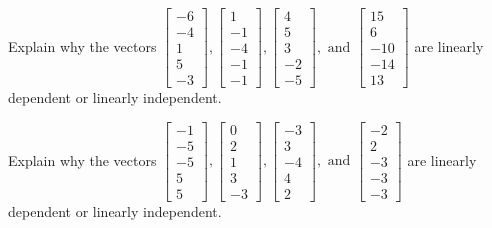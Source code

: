 \documentclass{article}
\begin{document}
\begin{exerciseStatement}
    Explain why the vectors \(\left[\begin{array}{r}
-6 \\
-4 \\
1 \\
5 \\
-3
\end{array}\right] , \left[\begin{array}{r}
1 \\
-1 \\
-4 \\
-1 \\
-1
\end{array}\right] , \left[\begin{array}{r}
4 \\
5 \\
3 \\
-2 \\
-5
\end{array}\right] , \text{ and } \left[\begin{array}{r}
15 \\
6 \\
-10 \\
-14 \\
13
\end{array}\right]\) are linearly dependent or linearly independent.


  
\end{exerciseStatement}

\begin{exerciseStatement}
    Explain why the vectors \(\left[\begin{array}{r}
-1 \\
-5 \\
-5 \\
5 \\
5
\end{array}\right] , \left[\begin{array}{r}
0 \\
2 \\
1 \\
3 \\
-3
\end{array}\right] , \left[\begin{array}{r}
-3 \\
3 \\
-4 \\
4 \\
2
\end{array}\right] , \text{ and } \left[\begin{array}{r}
-2 \\
2 \\
-3 \\
-3 \\
-3
\end{array}\right]\) are linearly dependent or linearly independent.


  
\end{exerciseStatement}
\end{document}
